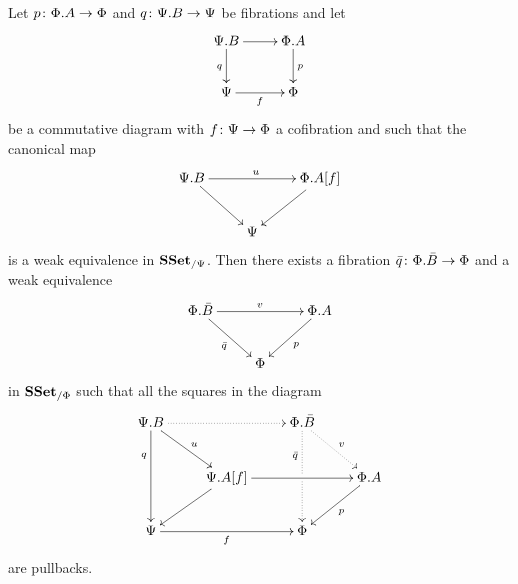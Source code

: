 \documentclass[reqno,10pt,a4paper,oneside,draft]{amsart}
\begin{document}
\begin{proposition}
\label{Prop:Homotopy_ext_prop}
Let $p \colon \Phi.A \to \Phi$ and $q \colon \Psi.B \to \Psi$ be fibrations and let
\[
\xymatrix{
\Psi.B \ar[r] \ar[d]_q & \Phi.A \ar[d]^p \\
\Psi \ar[r]_f & \Phi}
\]
be a commutative diagram with $f \colon \Psi \to \Phi$ a cofibration and such that the canonical map
\begin{equation}
\label{equ:gluedata}
\begin{gathered}
\xymatrix{
\Psi.B \ar[rr]^{u} \ar[dr] &  & \Phi.A[f] \ar[dl] \\
 & \Psi &}
 \end{gathered}
 \end{equation}
is a weak equivalence in $\mathbf{SSet}_{/ \Psi}$. Then there exists a fibration $\bar{q} \colon \Phi.\bar{B} \to \Phi$ and a weak equivalence
\[
\xymatrix{
\Phi.\bar{B} \ar[rr]^{v} \ar[dr]_{\bar{q}} &  & \Phi.A \ar[dl]^{p} \\
 & \Phi &}
 \]
 in $\mathbf{SSet}_{/\Phi}$ such that all the squares in the diagram
\[ 
\xymatrix{
 \Psi.B
  \ar@{.>}[rr]
  \ar[dr]^{u}
  \ar[dd]_(.3){q}
&&
  \Phi.\bar{B}
  \ar@{.>}[dr]^{v}
  \ar@{.>}[dd]_(.3){\bar{q}}|{\hole}
&\\&
  \Psi.A[f] 
  \ar[rr]
  \ar[dl]
&&
  \Phi.A
  \ar[dl]^{p}
\\
  \Psi
  \ar[rr]_{f}
&&
  \Phi
&
}
\]
are pullbacks. 
\end{proposition}
\end{document}
